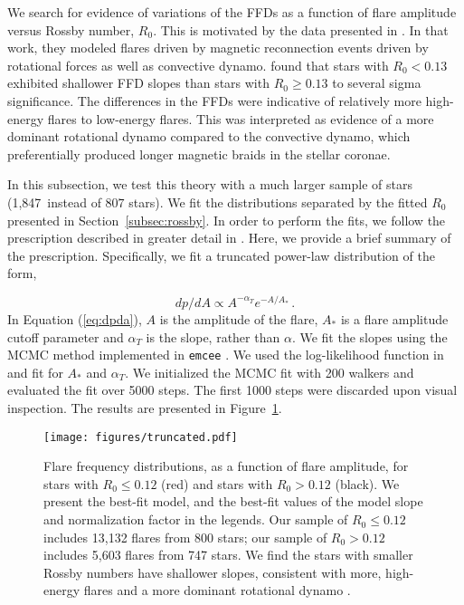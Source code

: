\documentclass[twocolumn, linenumbers]{aastex631}
\newcommand{\nprot}{1,847}
\begin{document}
We search for evidence of variations of the FFDs as a function of flare amplitude versus Rossby number, $R_0$. This is motivated by the data  presented in \cite{seligman22}. In that work, they
modeled flares driven by magnetic reconnection events driven by rotational forces as well as convective dynamo.  \cite{seligman22} found that stars with $R_0 < 0.13$ exhibited shallower FFD
slopes than stars with $R_0 \geq 0.13$ to several sigma significance. The differences in the FFDs were indicative of relatively more high-energy flares to low-energy flares. This was interpreted
as evidence of a more dominant rotational dynamo compared to the convective dynamo, which preferentially produced longer magnetic braids in the stellar coronae.

In this subsection, we test this theory with a much larger sample of stars (\nprot\ instead of $807$ stars). We fit the distributions separated by the fitted $R_0$ presented in
Section~\ref{subsec:rossby}. In order to perform the fits, we follow the prescription described in greater detail in \cite{seligman22}. Here, we provide a brief summary of the prescription.
Specifically, we fit a truncated power-law distribution of the form,

\begin{equation}\label{eq:dpda}
  dp/dA \propto A^{-\alpha_T} e^{-A/A_*}\,.
\end{equation}
In Equation (\ref{eq:dpda}),  $A$ is the amplitude of the flare, $A_*$ is a flare amplitude cutoff parameter and $\alpha_T$ is the slope, rather than $\alpha$. We fit the slopes using the
MCMC method implemented in \texttt{emcee} \citep{goodman10, emcee}. We used the log-likelihood function in \cite{seligman22} and  fit for $A_*$ and $\alpha_T$. We initialized the MCMC fit
with 200 walkers and evaluated the fit over 5000 steps. The first 1000 steps were discarded upon visual inspection. The results are presented in Figure~\ref{fig:truncated}.

\begin{figure}[ht!]
    \begin{centering}
        \texttt{[image: figures/truncated.pdf]}
        \caption{
            Flare frequency distributions, as a function of flare amplitude, for stars with $R_0 \leq 0.12$ (red) and stars with $R_0 > 0.12$ (black). We present the best-fit model, and the
            best-fit values of the model slope and normalization factor in the legends. Our sample of $R_0 \leq 0.12$ includes 13,132 flares from 800 stars; our sample of $R_0 > 0.12$
            includes 5,603 flares from 747 stars. We find the stars with smaller Rossby numbers have shallower slopes, consistent with more, high-energy flares and a more dominant rotational
            dynamo \citep{seligman22}.
        }
        \label{fig:truncated}
    \end{centering}
\end{figure}
\end{document}
